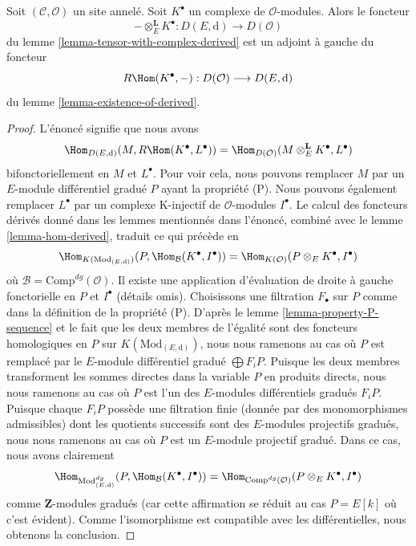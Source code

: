 \begin{lemma}
\label{lemma-tensor-with-complex-hom-adjoint}
Soit $(\mathcal{C}, \mathcal{O})$ un site annelé.
Soit $K^\bullet$ un complexe de $\mathcal{O}$-modules.
Alors le foncteur
$$
- \otimes_E^\mathbf{L} K^\bullet :
D(E, \text{d})
\longrightarrow
D(\mathcal{O})
$$
du lemme \ref{lemma-tensor-with-complex-derived} est un adjoint à
gauche du foncteur
$$
R\Hom(K^\bullet, -) : D(\mathcal{O}) \longrightarrow D(E, \text{d})
$$
du lemme \ref{lemma-existence-of-derived}.
\end{lemma}

\begin{proof}
L'énoncé signifie que nous avons
$$
\Hom_{D(E, \text{d})}(M, R\Hom(K^\bullet, L^\bullet)) =
\Hom_{D(\mathcal{O})}(M \otimes^\mathbf{L}_E K^\bullet, L^\bullet)
$$
bifonctoriellement en $M$ et $L^\bullet$. Pour voir cela, nous pouvons
remplacer $M$ par un $E$-module différentiel gradué $P$ ayant la
propriété (P). Nous pouvons également remplacer $L^\bullet$ par un
complexe K-injectif de $\mathcal{O}$-modules $I^\bullet$.
Le calcul des foncteurs dérivés donné dans les lemmes mentionnés dans l'énoncé,
combiné avec le lemme \ref{lemma-hom-derived}, traduit ce qui précède en
$$
\Hom_{K(\text{Mod}_{(E, \text{d})})}
(P, \Hom_\mathcal{B}(K^\bullet, I^\bullet)) =
\Hom_{K(\mathcal{O})}(P \otimes_E K^\bullet, I^\bullet)
$$
où $\mathcal{B} = \text{Comp}^{dg}(\mathcal{O})$. Il existe
une application d'évaluation de droite à gauche fonctorielle en
$P$ et $I^\bullet$ (détails omis). Choisissons
une filtration $F_\bullet$ sur $P$ comme dans la définition de la propriété (P). D'après le
lemme \ref{lemma-property-P-sequence} et le fait que les deux
membres de l'égalité sont des foncteurs homologiques en $P$ sur
$K(\text{Mod}_{(E, \text{d})})$, nous nous
ramenons au cas où $P$ est remplacé par le $E$-module
différentiel gradué $\bigoplus F_iP$. Puisque les deux membres
transforment les sommes directes dans la variable $P$ en
produits directs, nous nous ramenons au cas où $P$ est l'un des $E$-modules
différentiels gradués $F_iP$. Puisque chaque $F_iP$
possède une filtration finie (donnée par des monomorphismes admissibles)
dont les quotients successifs sont des $E$-modules projectifs gradués, nous
nous ramenons au cas où $P$ est un $E$-module projectif gradué. Dans ce cas,
nous avons clairement
$$
\Hom_{\text{Mod}^{dg}_{(E, \text{d})}}
(P, \Hom_\mathcal{B}(K^\bullet, I^\bullet)) =
\Hom_{\text{Comp}^{dg}(\mathcal{O})}(P \otimes_E K^\bullet, I^\bullet)
$$
comme $\mathbf{Z}$-modules gradués (car cette affirmation se réduit au cas $P =
E[k]$ où c'est évident). Comme l'isomorphisme est compatible avec les différentielles,
nous obtenons la conclusion.
\end{proof}

